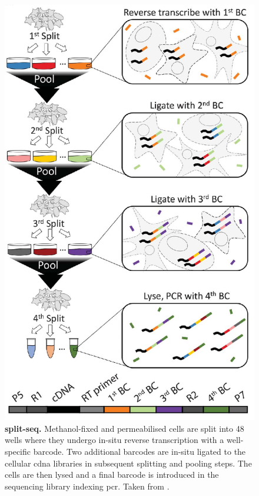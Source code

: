 \begin{figure}[ht]
\begin{minipage}[]{0.5\textwidth}
	\includegraphics[width=\textwidth]{./ims/rosenberg2018.png}
\end{minipage}\hfill
\begin{minipage}[]{0.45\textwidth}
	\caption[Split-pool ligation-based transcriptome sequencing]{\textbf{\Acrfull{split-seq}.} Methanol-fixed and permeabilised cells are split into 48 wells where they undergo in-situ reverse transcription with a well-specific barcode. Two additional barcodes are in-situ ligated to the cellular \acrshort{cdna} libraries in subsequent splitting and pooling steps. The cells are then lysed and a final barcode is introduced in the sequencing library indexing \acrshort{pcr}. Taken from \cite{rosenberg2018}.}
	\label{fig:rosenberg2018}
\end{minipage}
\end{figure}

